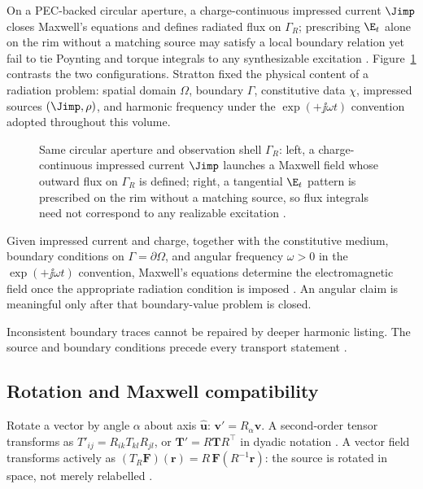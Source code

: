 On a PEC-backed circular aperture, a charge-continuous impressed current $\Jimp$ closes Maxwell's equations and defines radiated flux on $\Gamma_R$; prescribing $\E_t$ alone on the rim without a matching source may satisfy a local boundary relation yet fail to tie Poynting and torque integrals to any synthesizable excitation \cite{stratton1941,harrington2001}. Figure~\ref{fig:ch1.wp-matched-aperture} contrasts the two configurations. Stratton \cite{stratton1941} fixed the physical content of a radiation problem: spatial domain \(\Omega\), boundary \(\Gamma\), constitutive data \(\chi\), impressed sources \((\Jimp,\rho)\), and harmonic frequency under the \(\exp(+\jj\omega t)\) convention adopted throughout this volume.

\begin{figure}[t]
\centering
\VolIPhysFig{\VolIPhysMatchedAperture}
\caption{Same circular aperture and observation shell $\Gamma_R$: left, a charge-continuous impressed current $\Jimp$ launches a Maxwell field whose outward flux on $\Gamma_R$ is defined; right, a tangential $\E_t$ pattern is prescribed on the rim without a matching source, so flux integrals need not correspond to any realizable excitation \cite{stratton1941,harrington2001}.}
\label{fig:ch1.wp-matched-aperture}
\end{figure}

Given impressed current and charge, together with the constitutive medium, boundary conditions on $\Gamma=\partial\Omega$, and angular frequency $\omega>0$ in the $\exp(+\jj\omega t)$ convention, Maxwell's equations determine the electromagnetic field once the appropriate radiation condition is imposed \cite{maxwell1873,stratton1941}. An angular claim is meaningful only after that boundary-value problem is closed.

Inconsistent boundary traces cannot be repaired by deeper harmonic listing. The source and boundary conditions precede every transport statement \cite{stratton1941}.
\subsection{Rotation and Maxwell compatibility}
\label{sec:ch01.0.2}

Rotate a vector by angle $\alpha$ about axis $\hat{\mathbf{u}}$:
$\mathbf{v}'=R_\alpha\mathbf{v}$. A second-order tensor transforms as
$T'_{ij}=R_{ik}T_{kl}R_{jl}$, or $\mathbf{T}'=R\mathbf{T}R^\top$ in dyadic notation
\cite{stratton1941}. A vector field transforms actively as
$(T_R\mathbf{F})(\mathbf{r})=R\,\mathbf{F}(R^{-1}\mathbf{r})$: the source is rotated in
space, not merely relabelled \cite{hansen1988}.

